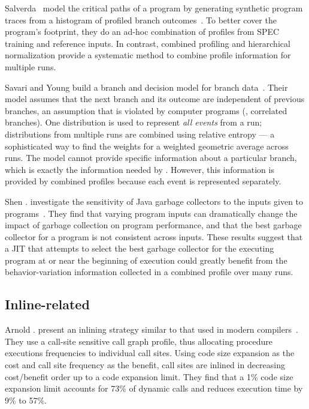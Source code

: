 Salverda \etal\ model the critical paths of a program by generating
synthetic program traces from a histogram of profiled branch
outcomes~\cite{SalverdaCGO08}. To better cover the program's
footprint, they do an ad-hoc combination of profiles from SPEC
training and reference inputs.  In contrast, combined profiling and
hierarchical normalization provide a systematic method to combine
profile information for multiple runs.

Savari and Young build a branch and decision model for branch
data~\cite{SavariYoungJIPL00}.  Their model assumes that the next
branch and its outcome are independent of previous branches, an
assumption that is violated by computer programs (\eg, correlated
branches).  One distribution is used to represent {\em all events}
from a run; distributions from multiple runs are combined using
relative entropy --- a sophisticated way to find the weights for a
weighted geometric average across runs.  %
The model cannot provide
specific information about a particular branch, which is exactly the
information needed by \FDO.  However, this information is provided by
combined profiles because each event is represented separately.

Shen \etal. investigate the sensitivity of Java garbage collectors to
the inputs given to programs~\cite{ShenSIGOPS09}.  They find that
varying program inputs can dramatically change the impact of garbage
collection on program performance, and that the best garbage collector
for a program is not consistent across inputs.  %
These results suggest
that a JIT that attempts to select the best garbage collector for the
executing program at or near the beginning of execution could greatly
benefit from the behavior-variation information collected in a
combined profile over many runs.

\subsection{Inline-related}

Arnold \etal. present an inlining strategy similar to that used in
modern compilers~\cite{Arnold00}. They use a call-site sensitive call
graph profile, thus allocating procedure executions frequencies to
individual call sites.  Using code size expansion as the cost and
call site frequency as the benefit, call sites are inlined in
decreasing cost/benefit order up to a code expansion limit.  They
find that a 1\% code size expansion limit accounts for 73\% of dynamic
calls and reduces execution time by 9\% to 57\%.


